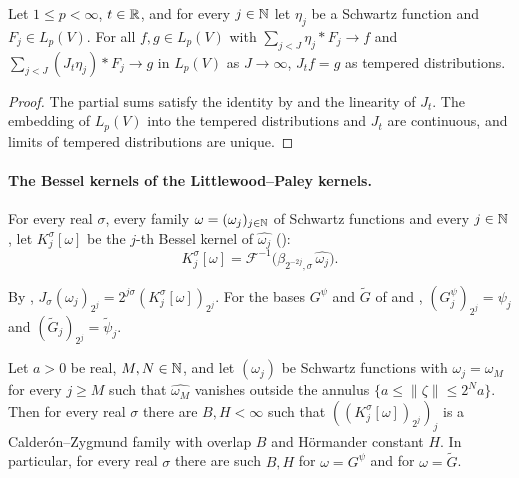 \begin{lemma}
\label{lem:bessel-potential-limits}
\leanok
{}
Let $1 \leq p < \infty$, $t \in \mathbb{R}$, and for every $j \in \mathbb{N}$ let $\eta_j$ be a Schwartz
function and $F_j \in L_p(V)$. For all $f, g \in L_p(V)$ with
$\sum_{j < J} \eta_j * F_j \to f$ and $\sum_{j < J} (J_t \eta_j) * F_j \to g$ in $L_p(V)$ as
$J \to \infty$, $J_t f = g$ as tempered distributions.
\end{lemma}

\begin{proof}
\leanok
The partial sums satisfy the identity by  and the
linearity of $J_t$. The embedding of $L_p(V)$ into the tempered distributions and $J_t$ are
continuous, and limits of tempered distributions are unique.
\end{proof}

\paragraph{The Bessel kernels of the Littlewood--Paley kernels.}

\begin{definition}
\label{def:bessel-base}
\leanok
{}
For every real $\sigma$, every family $\omega = (\omega_j)_{j \in \mathbb{N}}$ of Schwartz functions and
every $j \in \mathbb{N}$, let $K^\sigma_j[\omega]$ be the $j$-th Bessel kernel of $\widehat{\omega_j}$
():
\[
  K^\sigma_j[\omega] = \mathcal F^{-1} \bigl( \beta_{2^{-2j},\sigma} \, \widehat{\omega_j}
  \bigr) .
\]
\end{definition}

By ,
$J_\sigma (\omega_j)_{2^j} = 2^{j\sigma} (K^\sigma_j[\omega])_{2^j}$. For the bases $G^{\psi}$ and
$\tilde G$ of  and , $(G^{\psi}_j)_{2^j} = \psi_j$ and
$(\tilde G_j)_{2^j} = \tilde\psi_j$.

\begin{theorem}
\label{thm:cz-family-bessel-base}
\leanok
{}
Let $a > 0$ be real, $M, N \in \mathbb{N}$, and let $(\omega_j)$ be Schwartz functions with
$\omega_j = \omega_M$ for every $j \geq M$ such that $\widehat{\omega_M}$ vanishes outside the
annulus $\{a \leq \|\zeta\| \leq 2^N a\}$. Then for every real $\sigma$ there are
$B, H < \infty$ such that $((K^\sigma_j[\omega])_{2^j})_j$ is a Calder\'on--Zygmund family with
overlap $B$ and H\"ormander constant $H$. In particular, for every real $\sigma$ there are such
$B, H$ for $\omega = G^{\psi}$ and for $\omega = \tilde G$.
\end{theorem}

